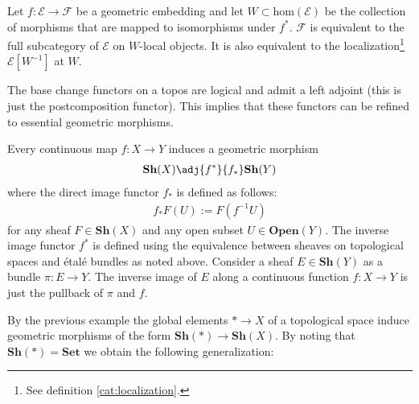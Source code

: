     \begin{property}\label{topos:characterization_embedding}
        Let $f:\mathcal{E}\rightarrow\mathcal{F}$ be a geometric embedding and let $W\subset\text{hom}(\mathcal{E})$ be the collection of morphisms that are mapped to isomorphisms under $f^*$. $\mathcal{F}$ is equivalent to the full subcategory of $\mathcal{E}$ on $W$-local objects. It is also equivalent to the localization\footnote{See definition \ref{cat:localization}.} $\mathcal{E}[W^{-1}]$ at $W$.
    \end{property}

    \begin{property}
        The base change functors on a topos are logical and admit a left adjoint (this is just the postcomposition functor). This implies that these functors can be refined to essential geometric morphisms.
    \end{property}

    \begin{example}\label{topos:topological_spaces}
        Every continuous map $f:X\rightarrow Y$ induces a geometric morphism
        \begin{gather}
            \mathbf{Sh}(X)\adj{f^*}{f_*}\mathbf{Sh}(Y)
        \end{gather}
        where the direct image functor $f_*$ is defined as follows:
        \begin{gather}
            f_*F(U) := F(f^{-1}U)
        \end{gather}
        for any sheaf $F\in\mathbf{Sh}(X)$ and any open subset $U\in\mathbf{Open}(Y)$. The inverse image functor $f^*$ is defined using the equivalence between sheaves on topological spaces and \'etal\'e bundles as noted above. Consider a sheaf $E\in\mathbf{Sh}(Y)$ as a bundle $\pi:E\rightarrow Y$. The inverse image of $E$ along a continuous function $f:X\rightarrow Y$ is just the pullback of $\pi$ and $f$.
    \end{example}

    By the previous example the global elements $\ast\rightarrow X$ of a topological space induce geometric morphisms of the form $\mathbf{Sh}(\ast)\rightarrow\mathbf{Sh}(X)$. By noting that $\mathbf{Sh}(\ast)=\mathbf{Set}$ we obtain the following generalization:

